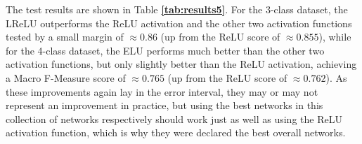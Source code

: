 The test results are shown in Table \textbf{\ref{tab:results5}}. For the 3-class dataset, the LReLU outperforms the ReLU activation and the other two activation functions tested by a small margin of $\approx0.86$ (up from the ReLU score of $\approx0.855$), while for the 4-class dataset, the ELU performs much better than the other two activation functions, but only slightly better than the ReLU activation, achieving a Macro F-Measure score of $\approx0.765$ (up from the ReLU score of $\approx0.762$). As these improvements again lay in the error interval, they may or may not represent an improvement in practice, but using the best networks in this collection of networks respectively should work just as well as using the ReLU activation function, which is why they were declared the best overall networks.\\


